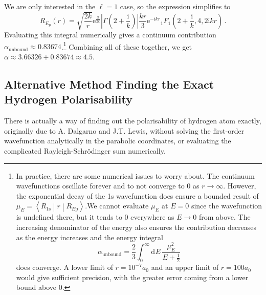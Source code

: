 \documentclass{article}
\theoremstyle{plain}\theoremheaderfont{\normalfont\itshape}\theorembodyfont{\rmfamily}\theoremseparator{.}\newtheorem*{rem}{Remark}\newtheorem*{ex}{Example}\newtheorem*{proof}{Proof}\newtheorem*{altp}{Alternative proof}
\theoremstyle{plain}\theoremheaderfont{\normalfont\bfseries}\theorembodyfont{\rmfamily}\theoremseparator{.}\newtheorem{thm}{Theorem}[section]\newtheorem{lem}[thm]{Lemma}\newtheorem{prop}[thm]{Proposition}\newtheorem*{cor}{Corollary}\newtheorem{defn}[thm]{Definition}\newtheorem{clm}[thm]{Claim}\newtheorem{clminproof}{Claim}
\theoremstyle{break}\theoremheaderfont{\normalfont\itshape}\theorembodyfont{\rmfamily}\theoremseparator{.\medskip}\newtheorem*{proofskip}{Proof}\newtheorem*{exs}{Examples}\newtheorem*{rems}{Remarks}
\theoremstyle{break}\theoremheaderfont{\normalfont\bfseries}\theorembodyfont{\rmfamily}\theoremseparator{.\medskip}\newtheorem{lemskip}[thm]{Lemma}\newtheorem{defnskip}[thm]{Definition}\newtheorem{propskip}[thm]{Proposition}\newtheorem{thmskip}[thm]{Theorem}
\numberwithin{equation}{section}
\newcommand{\ii}{\mathrm{i}}
\newcommand{\ee}{\mathrm{e}}
\newcommand{\dd}[2][]{\mathrm{d}^{#1} #2\,}
\newcommand{\mel}[3]{\left\langle #1 \middle| #2 \middle| #3 \right\rangle}
\newcommand{\abs}[1]{\left| #1 \right|}
\begin{document}
    We are only interested in the \(\ell=1\) case, so the expression simplifies to
    \begin{equation}
        R_{E_p}(r)=\sqrt{\frac{2k}{r}}\ee^{\frac{\pi}{2k}}\abs{\Gamma\left(2+\frac{\ii}{k}\right)}\frac{kr}{3}\ee^{-\ii kr}{_1F_1}\left(2+\frac{\ii}{k},4,2\ii kr\right)\,.
    \end{equation}
    Evaluating this integral numerically gives a continuum contribution \(\alpha_{\text{unbound}}\approx 0.83674\).\footnote{In practice, there are some numerical issues to worry about. The continuum wavefunctions oscillate forever and to not converge to \(0\) as \(r\to\infty\). However, the exponential decay of the 1s wavefunction does ensure a bounded result of \(\mu_E=\mel{R_{1\mathrm{s}}}{r}{R_{E\mathrm{p}}}\).We cannot evaluate \(\mu_E\) at \(E=0\) since the wavefunction is undefined there, but it tends to 0 everywhere as \(E\to 0\) from above. The increasing denominator of the energy also ensures the contribution decreases as the energy increases and the energy integral
    \begin{equation}
        \alpha_{\text{unbound}}=\frac{2}{3}\int_{0}^{\infty}\dd{E}\frac{\mu_E^2}{E+\frac{1}{2}}
    \end{equation}
    does converge. A lower limit of \(r=10^{-7}a_0\) and an upper limit of \(r=100 a_0\) would give sufficient precision, with the greater error coming from a lower bound above \(0\).} Combining all of these together, we get \(\alpha\approx 3.66326+0.83674\approx 4.5\).

    \subsection{Alternative Method Finding the Exact Hydrogen Polarisability}

    There is actually a way of finding out the polarisability of hydrogen atom exactly, originally due to A. Dalgarno and J.T. Lewis, without solving the first-order wavefunction analytically in the parabolic coordinates, or evaluating the complicated Rayleigh-Schr\"{o}dinger sum numerically.
\end{document}
